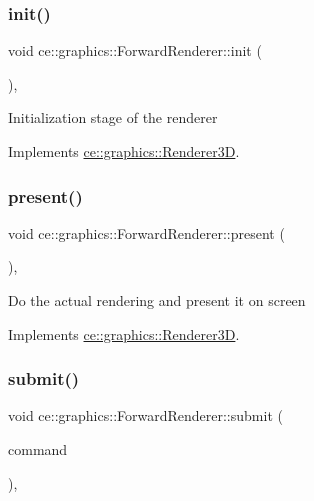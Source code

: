 \subsubsection{\texorpdfstring{init()}{init()}}
{\footnotesize\ttfamily void ce\+::graphics\+::\+Forward\+Renderer\+::init (\begin{DoxyParamCaption}{ }\end{DoxyParamCaption})\hspace{0.3cm}{\ttfamily [override]}, {\ttfamily [virtual]}}

Initialization stage of the renderer 

Implements \hyperlink{classce_1_1graphics_1_1_renderer3_d_ae887bbdc74af40838e6d059d30bb430b}{ce\+::graphics\+::\+Renderer3D}.

\mbox{\label{classce_1_1graphics_1_1_forward_renderer_a19933a9015f2abbd27b398e7a6d697b6}} 
\subsubsection{\texorpdfstring{present()}{present()}}
{\footnotesize\ttfamily void ce\+::graphics\+::\+Forward\+Renderer\+::present (\begin{DoxyParamCaption}{ }\end{DoxyParamCaption})\hspace{0.3cm}{\ttfamily [override]}, {\ttfamily [virtual]}}

Do the actual rendering and present it on screen 

Implements \hyperlink{classce_1_1graphics_1_1_renderer3_d_a7b258350b5af957550a2d29800d3c5b7}{ce\+::graphics\+::\+Renderer3D}.

\mbox{\label{classce_1_1graphics_1_1_forward_renderer_a3fb15f85368a78834b9d25b98461916c}} 
\subsubsection{\texorpdfstring{submit()}{submit()}}
{\footnotesize\ttfamily void ce\+::graphics\+::\+Forward\+Renderer\+::submit (\begin{DoxyParamCaption}\item[{const \hyperlink{structce_1_1graphics_1_1_render_command}{Render\+Command} \&}]{command }\end{DoxyParamCaption})\hspace{0.3cm}{\ttfamily [override]}, {\ttfamily [virtual]}}

